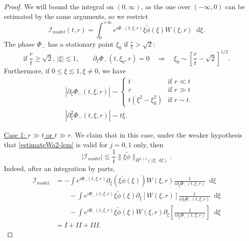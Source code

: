 \documentclass[11 pt]{amsart}
\theoremstyle{definition}
\theoremstyle{remark}
\numberwithin{equation}{section}
\newcommand{\dd}{\mathop{}\!\mathrm{d}}
\begin{document}
\begin{proof} 

We will bound the integral on $(0,\infty)$, as the one over $(-\infty,0)$ can be estimated by the same arguments, so we restrict
$$
\mathcal I_{model}(t,r) =  \int_{0}^{+\infty} e^{i \Phi_{-}(t,\xi,r)} \xi \widetilde{\phi}(\xi) W (\xi,r) \dd \xi.
$$
The phase $\Phi_-$ has a stationary point $\xi_0$ if $\frac r t> \sqrt{2}$:
\begin{equation} \label{boundphase-lem-2}
\mbox{if} \; \frac r t \geq \sqrt 2, \, |\xi| \lesssim 1,  \qquad \partial_\xi \Phi_-(t,\xi_0,r) = 0 \quad \Longrightarrow \quad  \xi_0 \sim \left[ \frac{r}{t} - \sqrt 2 \right]^{1/2}.
\end{equation}
Furthermore, if $0 \leq \xi \lesssim 1, \xi \neq 0$, we have
\begin{equation}
\begin{split}
\label{boundphase-lem}
& |\partial_\xi \Phi_-(t,\xi,r)| \sim 
\begin{cases}
t & \mbox{if $r \ll t$} \\
r & \mbox{if $r \gg t$} \\
t (\xi^2 - \xi_0^2)  & \mbox{if $r \sim t$}.
\end{cases}\\
& | \partial_\xi^2 \Phi_-(t,\xi,r)| \sim t \xi.
\end{split}
\end{equation}

\medskip

\noindent \underline{Case 1: $r \gg t$ or $t \gg r$}. We claim that in this case, under the weaker hypothesis that \eqref{estimateWa2-lem} is valid for $j=0,1$ only, then
\begin{equation} \label{estimation-model-integral-case1}
|\mathcal{I}_{model} |\lesssim \frac{1}{t}  \| \xi \widetilde{\phi} \|_{H^{1+\epsilon}(|\xi|\dd \xi)} .
\end{equation}
Indeed, after an integration by parts,
\begin{align*}
\mathcal{I}_{model} & = - \int e^{i \Phi_-(t,\xi,r)} \partial_\xi (\xi \widetilde{\phi}(\xi)) W(\xi,r)  \frac{1}{i \partial_\xi \Phi_-(t,\xi,r)} \dd \xi \\
& \qquad -  \int e^{i \Phi_-(t,\xi,r)}\xi \widetilde{\phi}(\xi)  \partial_\xi \left[ W(\xi,r)  \right] \frac{1}{i \partial_\xi \Phi_-(t,\xi,r)} \dd \xi \\
& \qquad -  \int e^{i \Phi_-(t,\xi,r)}\xi \widetilde{\phi}(\xi)  W(\xi,r) \partial_\xi \left[ \frac{1}{i \partial_\xi \Phi_-(t,\xi,r)} \right] \dd \xi \\
& = I + II + III.
\end{align*}


\end{proof}
\end{document}
